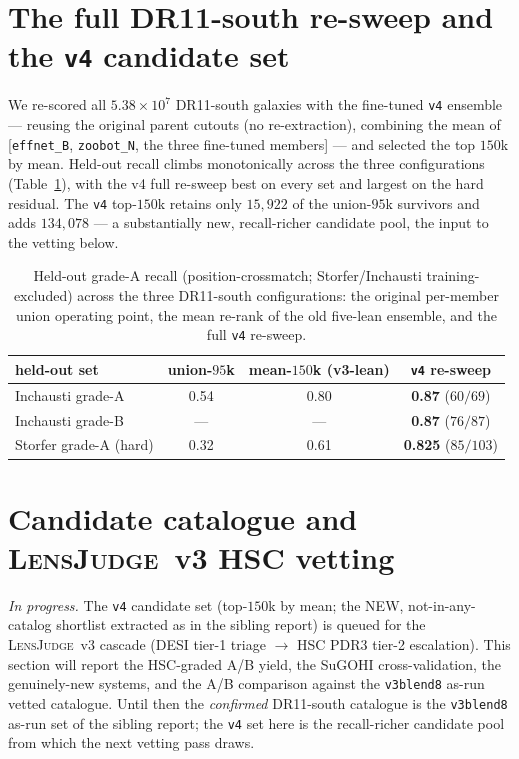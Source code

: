 \documentclass[11pt,letterpaper]{article}
\newcommand{\lj}{\textsc{LensJudge}}
\newcommand{\vb}{\texttt{v3blend8}}
\newcommand{\vc}{\texttt{v4}}
\begin{document}
\section{The full DR11-south re-sweep and the \vc{} candidate set}
\label{sec:resweep}
We re-scored all $5.38\times10^{7}$ DR11-south galaxies with the fine-tuned \vc{} ensemble --- reusing the
original parent cutouts (no re-extraction), combining the mean of [\texttt{effnet\_B}, \texttt{zoobot\_N},
the three fine-tuned members] --- and selected the top $150$k by mean. Held-out recall climbs monotonically
across the three configurations (Table~\ref{tab:recall}), with the v4 full re-sweep best on every set and
largest on the hard residual. The \vc{} top-$150$k retains only $15{,}922$ of the union-$95$k survivors and
adds $134{,}078$ --- a substantially new, recall-richer candidate pool, the input to the vetting below.

\begin{table}[t]\centering
\caption{Held-out grade-A recall (position-crossmatch; Storfer/Inchausti training-excluded) across the
three DR11-south configurations: the original per-member union operating point, the mean re-rank of the
old five-lean ensemble, and the full \vc{} re-sweep.}
\label{tab:recall}
\begin{tabular}{lccc}
\toprule
held-out set & union-$95$k & mean-$150$k (v3-lean) & \textbf{\vc{} re-sweep} \\
\midrule
Inchausti grade-A & 0.54 & 0.80 & \textbf{0.87} ($60/69$) \\
Inchausti grade-B & --- & --- & \textbf{0.87} ($76/87$) \\
Storfer grade-A (hard) & 0.32 & 0.61 & \textbf{0.825} ($85/103$) \\
\bottomrule
\end{tabular}
\end{table}

\section{Candidate catalogue and \lj{}~v3 HSC vetting}
\label{sec:vet}
\emph{In progress.} The \vc{} candidate set (top-$150$k by mean; the NEW, not-in-any-catalog shortlist
extracted as in the sibling report) is queued for the \lj{}~v3 cascade (DESI tier-1 triage $\to$ HSC PDR3
tier-2 escalation). This section will report the HSC-graded A/B yield, the SuGOHI cross-validation, the
genuinely-new systems, and the A/B comparison against the \vb{} as-run vetted catalogue. Until then the
\emph{confirmed} DR11-south catalogue is the \vb{} as-run set of the sibling report; the \vc{} set here is
the recall-richer candidate pool from which the next vetting pass draws.
\end{document}
